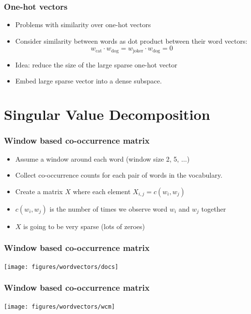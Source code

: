\begin{frame}
\frametitle{One-hot vectors}
\begin{itemize}[<+->]
\item Problems with similarity over one-hot vectors 
\item Consider similarity between words as dot product between their word vectors:
\[ w_{\textrm{cat}} \cdot w_{\textrm{dog}} = 
w_{\textrm{joker}} \cdot w_{\textrm{dog}} = 
0 \]
\item Idea: reduce the size of the large sparse one-hot vector
\item Embed large sparse vector into a dense subspace.
\end{itemize}
\end{frame}

\section{Singular Value Decomposition}
\frame{\tableofcontents[currentsection]}

\begin{frame}
\frametitle{Window based co-occurrence matrix}
\begin{itemize}[<+->]
\item Assume a window around each word (window size 2, 5, $\ldots$)
\item Collect co-occurrence counts for each pair of words in the vocabulary.
\item Create a matrix $X$ where each element $X_{i,j} = c(w_i, w_j)$
\item $c(w_i, w_j)$ is the number of times we observe word $w_i$ and $w_j$ together
\item $X$ is going to be very sparse (lots of zeroes)
\end{itemize}
\end{frame}

\begin{frame}
\frametitle{Window based co-occurrence matrix}
\begin{center}
\texttt{[image: figures/wordvectors/docs]}	
\end{center}
\end{frame}

\begin{frame}
\frametitle{Window based co-occurrence matrix}
\begin{center}
\texttt{[image: figures/wordvectors/wcm]}	
\end{center}
\end{frame}

